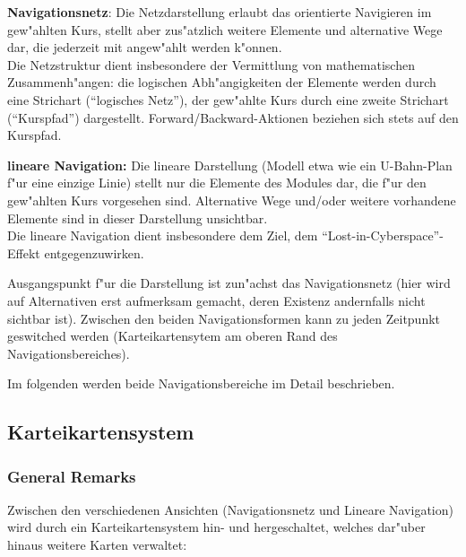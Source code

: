 \begin{list_sabina}
        \item \textbf{Navigationsnetz}: Die Netzdarstellung erlaubt das orientierte
          Navigieren im gew"ahlten Kurs, stellt aber zus"atzlich weitere
          Elemente und alternative Wege dar, die jederzeit mit angew"ahlt
          werden k"onnen. \\
          Die Netzstruktur dient insbesondere der Vermittlung von
          mathematischen Zusammenh"angen: die logischen Abh"angigkeiten der
          Elemente werden durch eine Strichart (``logisches Netz''), 
          der gew"ahlte Kurs durch eine zweite Strichart (``Kurspfad'')
          dargestellt. Forward/Backward-Aktionen beziehen sich stets
          auf den Kurspfad.
        \item \textbf{lineare Navigation:} Die lineare Darstellung (Modell
          etwa wie ein U-Bahn-Plan f"ur eine einzige Linie) stellt nur die
          Elemente des Modules dar, die f"ur den gew"ahlten Kurs vorgesehen
          sind. Alternative Wege und/oder weitere vorhandene Elemente sind in
          dieser Darstellung unsichtbar.\\
	  Die lineare Navigation dient insbesondere dem Ziel, dem 
	  ``Lost-in-Cyberspace''-Effekt entgegenzuwirken.
\end{list_sabina}


Ausgangspunkt f"ur die Darstellung ist zun"achst das Navigationsnetz (hier
wird auf Alternativen erst aufmerksam gemacht, deren Existenz andernfalls
nicht sichtbar ist). Zwischen den beiden Navigationsformen kann zu jeden
Zeitpunkt geswitched werden (Karteikartensytem am oberen Rand des
Navigationsbereiches).


Im folgenden werden beide Navigationsbereiche im Detail beschrieben.

\subsection{Karteikartensystem}

\subsubsection{General Remarks}

Zwischen den verschiedenen Ansichten (Navigationsnetz und Lineare
Navigation) wird durch ein Karteikartensystem hin- und hergeschaltet,
welches dar"uber hinaus weitere Karten verwaltet:

